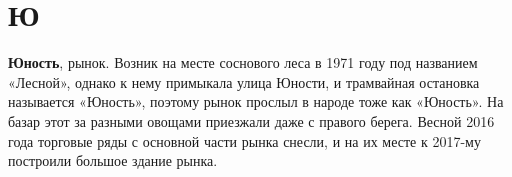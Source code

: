 \chapter*{Ю}

\textbf{Юность}, рынок. Возник на месте соснового леса в 1971 году под названием «Лесной», однако к нему примыкала улица Юности, и трамвайная остановка называется «Юность», поэтому рынок прослыл в народе тоже как «Юность». На базар этот за разными овощами приезжали даже с правого берега. Весной 2016 года торговые ряды с основной части рынка снесли, и на их месте к 2017-му построили большое здание рынка.
